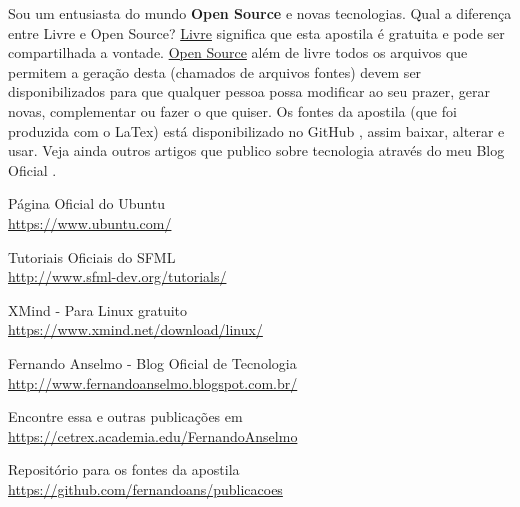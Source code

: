 \documentclass[a4paper,11pt]{article}
\begin{document}
Sou um entusiasta do mundo \textbf{Open Source} e novas tecnologias. Qual a diferença entre Livre e Open Source? \underline{Livre} significa que esta apostila é gratuita e pode ser compartilhada a vontade. \underline{Open Source} além de livre todos os arquivos que permitem a geração desta (chamados de arquivos fontes) devem ser disponibilizados para que qualquer pessoa possa modificar ao seu prazer, gerar novas, complementar ou fazer o que quiser. Os fontes da apostila (que foi produzida com o LaTex) está disponibilizado no GitHub \cite{github}, assim baixar, alterar e usar. Veja ainda outros artigos que publico sobre tecnologia através do meu Blog Oficial \cite{fernandoanselmo}.

\begin{thebibliography}{4}
  Página Oficial do Ubuntu \\
  \url{https://www.ubuntu.com/}

  Tutoriais Oficiais do SFML \\
  \url{http://www.sfml-dev.org/tutorials/}

  XMind - Para Linux gratuito \\
  \url{https://www.xmind.net/download/linux/}
  
  Fernando Anselmo - Blog Oficial de Tecnologia \\
  \url{http://www.fernandoanselmo.blogspot.com.br/}

  Encontre essa e outras publicações em \\
  \url{https://cetrex.academia.edu/FernandoAnselmo}

  Repositório para os fontes da apostila \\
  \url{https://github.com/fernandoans/publicacoes}
\end{thebibliography}
  
\end{document}
